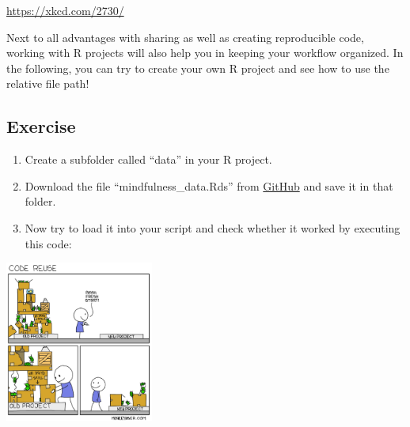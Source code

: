 \documentclass[
]{book}
\newenvironment{Shaded}{\begin{snugshade}}{\end{snugshade}}
\newcommand{\CommentTok}[1]{\textcolor[rgb]{0.56,0.35,0.01}{\textit{#1}}}
\newcommand{\FunctionTok}[1]{\textcolor[rgb]{0.13,0.29,0.53}{\textbf{#1}}}
\newcommand{\NormalTok}[1]{#1}
\newcommand{\OtherTok}[1]{\textcolor[rgb]{0.56,0.35,0.01}{#1}}
\newcommand{\StringTok}[1]{\textcolor[rgb]{0.31,0.60,0.02}{#1}}
\providecommand{\tightlist}{%
  \setlength{\itemsep}{0pt}\setlength{\parskip}{0pt}}
\begin{document}
\url{https://xkcd.com/2730/}

Next to all advantages with sharing as well as creating reproducible code, working with R projects will also help you in keeping your workflow organized.
In the following, you can try to create your own R project and see how to use the relative file path!

\subsection*{Exercise}\label{exercise}

\begin{enumerate}
\def\labelenumi{\arabic{enumi}.}
\tightlist
\item
  Create a subfolder called ``data'' in your R project.
\item
  Download the file ``mindfulness\_data.Rds'' from \href{https://github.com/the-tave/psych_research_in_r/blob/main/data/mindfulness_data.Rds}{GitHub} and save it in that folder.
\item
  Now try to load it into your script and check whether it worked by executing this code:
\end{enumerate}

\begin{Shaded}
\end{Shaded}

\includegraphics[width=\textwidth,height=2.08333in]{./img/code_reuse.jpg}
\end{document}
